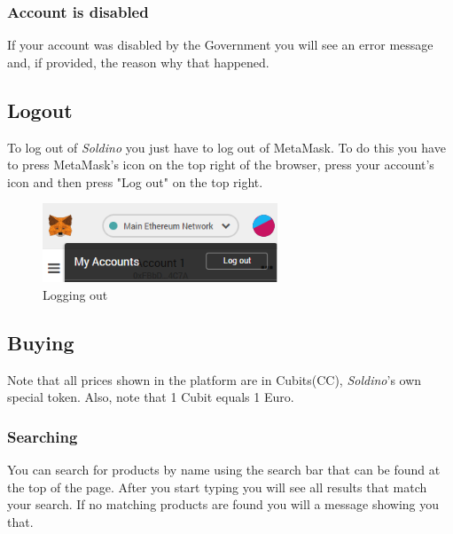 		\subsubsection{Account is disabled}
		If your account was disabled by the Government you will see an error 
		message and, if provided, the reason why that happened.
	\subsection{Logout}
	To log out of \textit{Soldino} you just have to log out of 
	MetaMask\glosp. To do this you have to press MetaMask's icon on the top 
	right of the browser, press your account's icon and then press "Log out"
	on the top right.
	\begin{figure}[H]
		\includegraphics[width=7cm]{res/images/logout_metamask.png}
		\centering
		\caption{Logging out}
	\end{figure}
	\subsection{Buying}
	Note that all prices shown in the platform are in Cubits\glosp (CC\glo), 
	\textit{Soldino}'s own special token. Also, note that 1 Cubit equals 1 Euro.
		\subsubsection{Searching}
		You can search for products by name using the search bar that can be found 
		at the top of the page. After you start typing you will 
		see all results that match your search. If no matching products are 
		found you will a message showing you that.
%		
